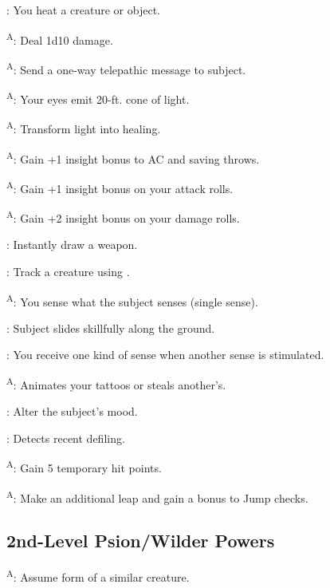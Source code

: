 : You heat a creature or object.

\textsuperscript{A}: Deal 1d10 damage.

\textsuperscript{A}: Send a one-way telepathic message to subject.

\textsuperscript{A}: Your eyes emit 20-ft. cone of light.

\textsuperscript{A}: Transform light into healing.

\textsuperscript{A}: Gain +1 insight bonus to AC and saving throws.

\textsuperscript{A}: Gain +1 insight bonus on your attack rolls.

\textsuperscript{A}: Gain +2 insight bonus on your damage rolls.

: Instantly draw a weapon.

: Track a creature using .

\textsuperscript{A}: You sense what the subject senses (single sense).

: Subject slides skillfully along the ground.

: You receive one kind of sense when another sense is stimulated.

\textsuperscript{A}: Animates your tattoos or steals another's.

: Alter the subject's mood.

: Detects recent defiling.

\textsuperscript{A}: Gain 5 temporary hit points.

\textsuperscript{A}: Make an additional leap and gain a bonus to Jump checks.




\subsection{2nd-Level Psion/Wilder Powers}

\textsuperscript{A}: Assume form of a similar creature.

